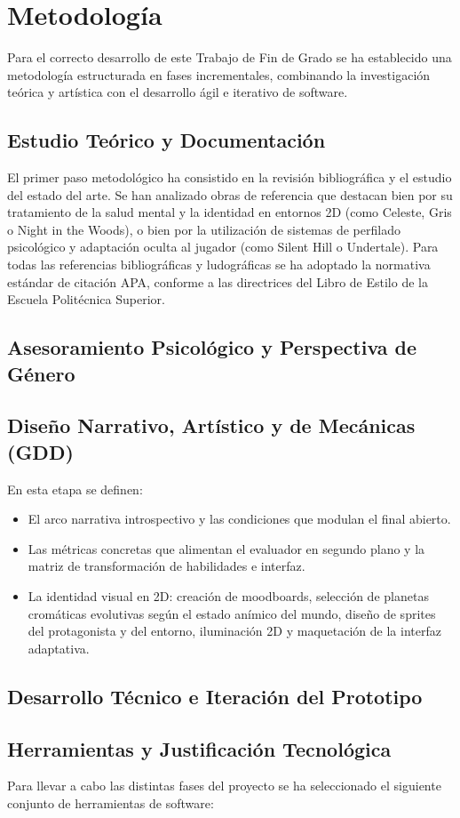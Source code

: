 \chapter{Metodología}
Para el correcto desarrollo de este Trabajo de Fin de Grado se ha establecido una metodología estructurada en fases incrementales, combinando la investigación teórica y artística con el desarrollo ágil e iterativo de software.
\section{Estudio Teórico y Documentación}
El primer paso metodológico ha consistido en la revisión bibliográfica y el estudio del estado del arte.
Se han analizado obras de referencia que destacan bien por su tratamiento de la salud mental y la identidad en entornos 2D (como Celeste, Gris o Night in the Woods), o bien por la utilización de sistemas de perfilado psicológico y adaptación oculta al jugador (como Silent Hill o Undertale).
Para todas las referencias bibliográficas y ludográficas se ha adoptado la normativa estándar de citación APA, conforme a las directrices del Libro de Estilo de la Escuela Politécnica Superior.
\section{Asesoramiento Psicológico y Perspectiva de Género}
\section{Diseño Narrativo, Artístico y de Mecánicas (GDD)}
En esta etapa se definen:
\begin{itemize}
    \item El arco narrativa introspectivo y las condiciones que modulan el final abierto.
    \item Las métricas concretas que alimentan el evaluador en segundo plano y la matriz de transformación de habilidades e interfaz.
    \item La identidad visual en 2D: creación de moodboards, selección de planetas cromáticas evolutivas según el estado anímico del mundo, diseño de sprites del protagonista y del entorno, iluminación 2D y maquetación de la interfaz adaptativa.
\end{itemize}
\section{Desarrollo Técnico e Iteración del Prototipo}
\section{Herramientas y Justificación Tecnológica}
Para llevar a cabo las distintas fases del proyecto se ha seleccionado el siguiente conjunto de herramientas de software:
